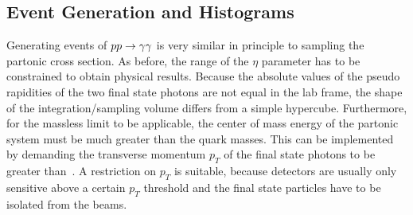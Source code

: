 \subsection{Event Generation and Histograms}%
\label{sec:ppevents}

Generating events of \(pp\rightarrow\gamma\gamma\) is very similar in principle to
sampling the partonic cross section. As before, the range of the
\(\eta\) parameter has to be constrained to obtain physical
results. Because the absolute values of the pseudo rapidities of the
two final state photons are not equal in the lab frame, the shape of
the integration/sampling volume differs from a simple
hypercube. Furthermore, for the massless limit to be applicable, the
center of mass energy of the partonic system must be much greater than
the quark masses. This can be implemented by demanding the transverse
momentum \(p_T\) of the final state photons to be greater
than~. A restriction on \(p_T\) is
suitable, because detectors are usually only sensitive above a certain
\(p_T\) threshold and the final state particles have to be isolated
from the beams.

